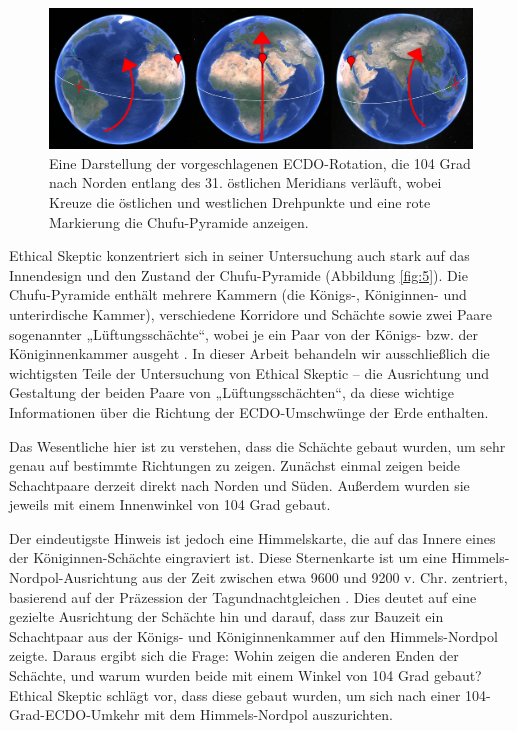 \documentclass[10pt,twocolumn,letterpaper]{article}
\begin{document}
\begin{figure}[b]
\begin{center}
\includegraphics[width=1\textwidth]{drawing.jpg}
\end{center}
   \caption{Eine Darstellung der vorgeschlagenen ECDO-Rotation, die 104 Grad nach Norden entlang des 31. östlichen Meridians verläuft, wobei Kreuze die östlichen und westlichen Drehpunkte und eine rote Markierung die Chufu-Pyramide anzeigen.}
\label{fig:6}
\end{figure}

Ethical Skeptic konzentriert sich in seiner Untersuchung \cite{28} auch stark auf das Innendesign und den Zustand der Chufu-Pyramide (Abbildung \ref{fig:5}). Die Chufu-Pyramide enthält mehrere Kammern (die Königs-, Königinnen- und unterirdische Kammer), verschiedene Korridore und Schächte sowie zwei Paare sogenannter „Lüftungsschächte“, wobei je ein Paar von der Königs- bzw. der Königinnenkammer ausgeht \cite{29,30}. In dieser Arbeit behandeln wir ausschließlich die wichtigsten Teile der Untersuchung von Ethical Skeptic – die Ausrichtung und Gestaltung der beiden Paare von „Lüftungsschächten“, da diese wichtige Informationen über die Richtung der ECDO-Umschwünge der Erde enthalten.

Das Wesentliche hier ist zu verstehen, dass die Schächte gebaut wurden, um sehr genau auf bestimmte Richtungen zu zeigen. Zunächst einmal zeigen beide Schachtpaare derzeit direkt nach Norden und Süden. Außerdem wurden sie jeweils mit einem Innenwinkel von 104 Grad gebaut.

Der eindeutigste Hinweis ist jedoch eine Himmelskarte, die auf das Innere eines der Königinnen-Schächte eingraviert ist. Diese Sternenkarte ist um eine Himmels-Nordpol-Ausrichtung aus der Zeit zwischen etwa 9600 und 9200 v. Chr. zentriert, basierend auf der Präzession der Tagundnachtgleichen \cite{28}. Dies deutet auf eine gezielte Ausrichtung der Schächte hin und darauf, dass zur Bauzeit ein Schachtpaar aus der Königs- und Königinnenkammer auf den Himmels-Nordpol zeigte. Daraus ergibt sich die Frage: Wohin zeigen die anderen Enden der Schächte, und warum wurden beide mit einem Winkel von 104 Grad gebaut? Ethical Skeptic schlägt vor, dass diese gebaut wurden, um sich nach einer 104-Grad-ECDO-Umkehr mit dem Himmels-Nordpol auszurichten.
\end{document}
